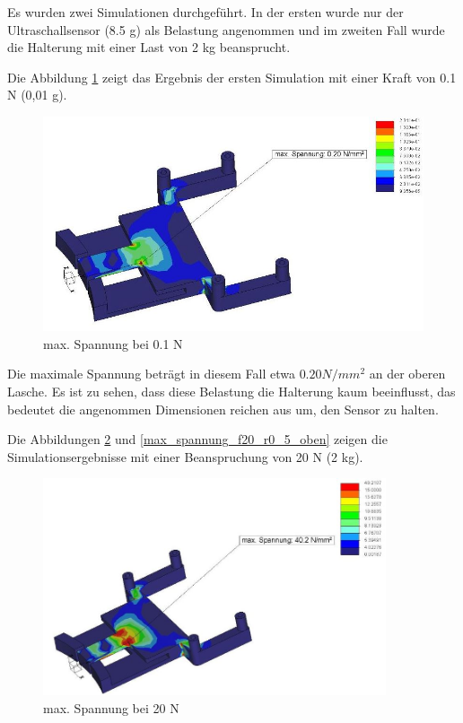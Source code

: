 	Es wurden zwei Simulationen durchgeführt. In der ersten wurde nur der Ultraschallsensor (8.5 g) als Belastung angenommen und im zweiten Fall  wurde die Halterung mit einer Last von 2 kg beansprucht.

	Die Abbildung \ref{max_spannung_f0_1_r0_5} zeigt das Ergebnis der ersten Simulation mit einer Kraft von 0.1 N (0,01 g).

			\begin{figure}[H]
			\begin{centering}
			\includegraphics[width = 1.1\textwidth]{Bilder/max_spannung_f0_1_r0_5}
			\par\end{centering}
			\caption{max. Spannung bei 0.1 N}
			\label{max_spannung_f0_1_r0_5}
			\end{figure}

	Die maximale Spannung beträgt in diesem Fall etwa $0.20 N/mm^{2}$ an der oberen Lasche.
	Es ist zu sehen, dass diese Belastung die Halterung kaum beeinflusst, das bedeutet die angenommen Dimensionen reichen aus um, den Sensor zu halten.

			\newpage

	Die Abbildungen \ref{max_spannung_f20_r0_5} und \ref{max_spannung_f20_r0_5_oben}  zeigen die Simulationsergebnisse mit einer Beanspruchung von 20 N (2 kg).

			\begin{figure}[H]
			\begin{centering}
			\includegraphics[width = 0.9\textwidth]{Bilder/max_spannung_f20_r0_5}
			\par\end{centering}
			\caption{max. Spannung bei 20 N}
			\label{max_spannung_f20_r0_5}
			\end{figure}

